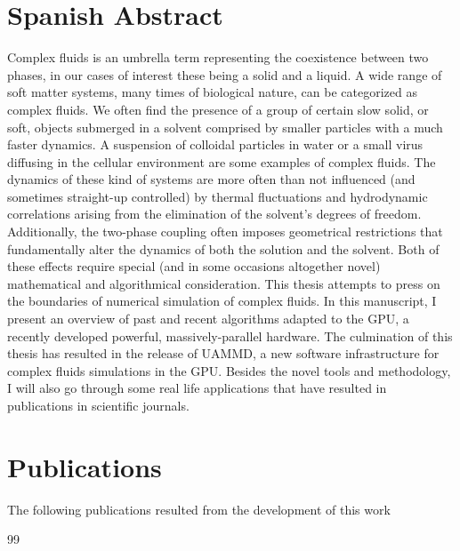\documentclass[ twoside,openright,titlepage,numbers=noenddot,%
headinclude,footinclude,cleardoublepage=empty,abstract=on,
BCOR=5mm,paper=a4,fontsize=11pt, dvipsnames
]{scrreprt}
\begin{document}
\cleardoublepage
\newpage

\chapter*{Spanish Abstract}
Complex fluids is an umbrella term representing the coexistence between two phases, in our cases of interest these being a solid and a liquid. A wide range of soft matter systems, many times of biological nature, can be categorized as complex fluids. We often find the presence of a group of certain slow solid, or soft, objects submerged in a solvent comprised by smaller particles with a much faster dynamics. A suspension of colloidal particles in water or a small virus diffusing in the cellular environment are some examples of complex fluids. The dynamics of these kind of systems are more often than not influenced (and sometimes straight-up controlled) by thermal fluctuations and hydrodynamic correlations arising from the elimination of the solvent's degrees of freedom. Additionally, the two-phase coupling often imposes geometrical restrictions that fundamentally alter the dynamics of both the solution and the solvent. Both of these effects require special (and in some occasions altogether novel) mathematical and algorithmical consideration. This thesis attempts to press on the boundaries of numerical simulation of complex fluids. In this manuscript, I present an overview of past and recent algorithms adapted to the GPU, a recently developed powerful, massively-parallel hardware. The culmination of this thesis has resulted in the release of UAMMD, a new software infrastructure for complex fluids simulations in the GPU. Besides the novel tools and methodology, I will also go through some real life applications that have resulted in publications in scientific journals.
\cleardoublepage
\newpage
{}
\chapter*{Publications}

The following publications resulted from the development of this work

\begin{refsection}[ownpubs]
  \small
    \expandafter\def\csname blx@maxbibnames\endcsname{99}%
    \nocite{*} %
    \printbibliography[heading=none]
\end{refsection}
\end{document}
